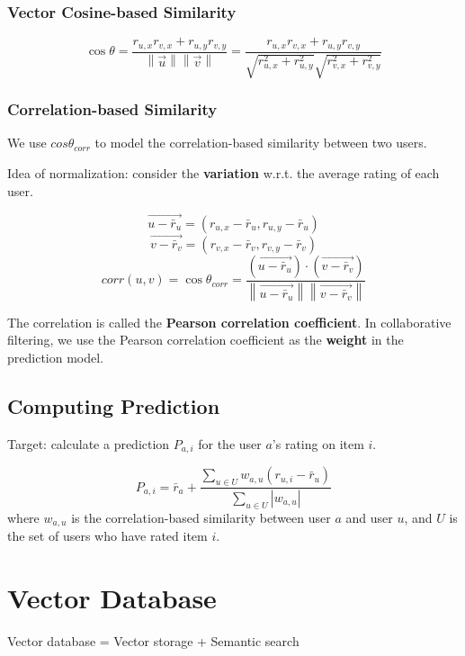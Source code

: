 \documentclass[11pt,a4paper]{article}
\begin{document}
\subsubsection{Vector Cosine-based Similarity}
\[
\cos \theta = \frac{r_{u,x} r_{v,x} + r_{u,y} r_{v,y}}{\left\|\vec{u}\right\| \left\|\vec{v}\right\|} = \frac{r_{u,x} r_{v,x} + r_{u,y} r_{v,y}}{\sqrt{r_{u,x}^2 + r_{u,y}^2} \sqrt{r_{v,x}^2 + r_{v,y}^2}}
\]

\subsubsection{Correlation-based Similarity}
We use $cos \theta_{corr}$ to model the correlation-based similarity between two users. \par
Idea of normalization: consider the \textbf{variation} w.r.t. the average rating of each user. \par
\[
\overrightarrow{u - \bar{r}_u} = (r_{u,x} - \bar{r}_u, r_{u,y} - \bar{r}_u)
\]
\[
\overrightarrow{v - \bar{r}_v} = (r_{v,x} - \bar{r}_v, r_{v,y} - \bar{r}_v)
\]
\[
corr(u,v) = \cos \theta_{corr} = \frac{(\overrightarrow{u - \bar{r}_u}) \cdot (\overrightarrow{v - \bar{r}_v})}{\left\|\overrightarrow{u - \bar{r}_u}\right\| \left\|\overrightarrow{v - \bar{r}_v}\right\|}
\]


The correlation is called the \textbf{Pearson correlation coefficient}. In collaborative filtering, we use the Pearson correlation coefficient as the \textbf{weight} in the prediction model.

\subsection{Computing Prediction}
Target: calculate a prediction $P_{a,i}$ for the user $a$'s rating on item $i$. \par
\[
P_{a,i} = \bar{r}_a + \frac{\sum_{u \in U} w_{a,u} (r_{u,i} - \bar{r}_u)}{\sum_{u \in U} |w_{a,u}|}
\]
where $w_{a,u}$ is the correlation-based similarity between user $a$ and user $u$, and $U$ is the set of users who have rated item $i$.

\section{Vector Database}
Vector database = Vector storage + Semantic search \par
{}
\end{document}
